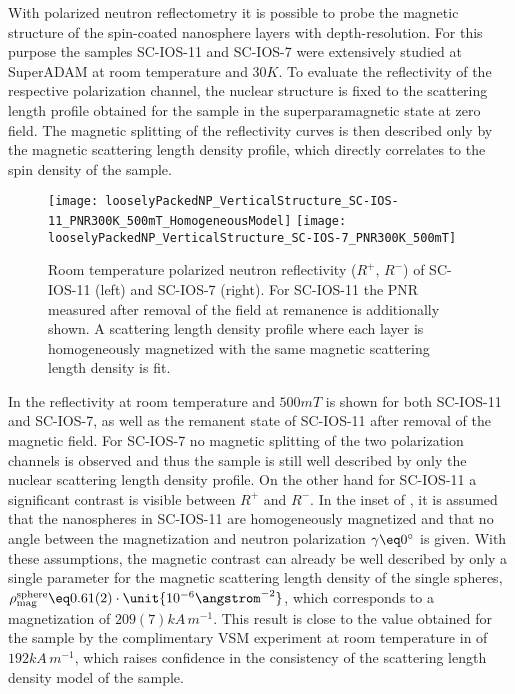 \documentclass[\main/dresen_thesis.tex]{subfiles}
\begin{document}
  \label{sec:looselyPackedNS:layers:pnr}
  With polarized neutron reflectometry it is possible to probe the magnetic structure of the spin-coated nanosphere layers with depth-resolution.
  For this purpose the samples SC-IOS-11 and SC-IOS-7 were extensively studied at SuperADAM at room temperature and $30 \unit{K}$.
  To evaluate the reflectivity of the respective polarization channel, the nuclear structure is fixed to the scattering length profile obtained for the sample in the superparamagnetic state at zero field.
  The magnetic splitting of the reflectivity curves is then described only by the magnetic scattering length density profile, which directly correlates to the spin density of the sample.

  \begin{figure}[tb]
    \centering
    \texttt{[image: looselyPackedNP\_VerticalStructure\_SC-IOS-11\_PNR300K\_500mT\_HomogeneousModel]}
    \texttt{[image: looselyPackedNP\_VerticalStructure\_SC-IOS-7\_PNR300K\_500mT]}
    \caption{\label{fig:looselyPackedNP:layer:pnrRoomTemperatureMagnetic}Room temperature polarized neutron reflectivity ($R^{+},\, R^{-}$) of SC-IOS-11 (left) and SC-IOS-7 (right). For SC-IOS-11 the PNR measured after removal of the field at remanence is additionally shown. A scattering length density profile where each layer is homogeneously magnetized with the same magnetic scattering length density is fit.}
  \end{figure}
  In  the reflectivity at room temperature and $500 \unit{mT}$ is shown for both SC-IOS-11 and SC-IOS-7, as well as the remanent state of SC-IOS-11 after removal of the magnetic field.
  For SC-IOS-7 no magnetic splitting of the two polarization channels is observed and thus the sample is still well described by only the nuclear scattering length density profile.
  On the other hand for SC-IOS-11 a significant contrast is visible between $R^{+}$ and $R^{-}$.
  In the inset of , it is assumed that the nanospheres in SC-IOS-11 are homogeneously magnetized and that no angle between the magnetization and neutron polarization $\gamma \eq 0 ^\circ$ is given.
  With these assumptions, the magnetic contrast can already be well described by only a single parameter for the magnetic scattering length density of the single spheres, $\rho_\mathrm{mag}^\mathrm{sphere} \eq 0.61(2) \cdot \unit{10^{-6} \angstrom^{-2}}$, which corresponds to a magnetization of $209(7) \unit{kA \, m^{-1}}$.
  This result is close to the value obtained for the sample by the complimentary VSM experiment at room temperature in  of $192 \unit{kA \,m^{-1}}$, which raises confidence in the consistency of the scattering length density model of the sample.
\end{document}
